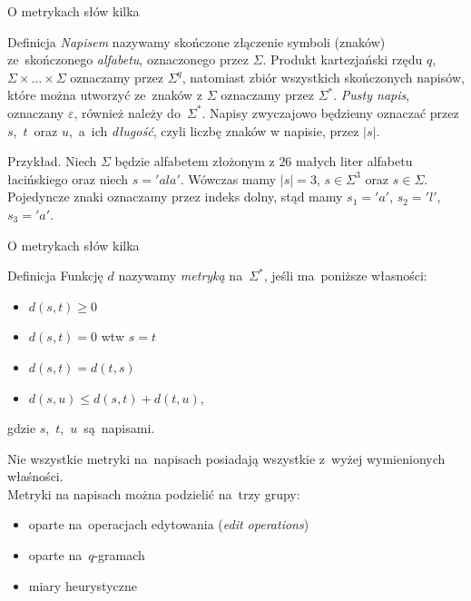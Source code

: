 \documentclass[11pt,pdftex,mathserif]{beamer}\usepackage[]{graphicx}\usepackage[]{color}
\theoremstyle{definition}
\begin{document}
\begin{frame}{O metrykach słów kilka}
\begin{block}{Definicja}
\emph{Napisem} nazywamy skończone złączenie symboli (znaków) ze~skończonego \emph{alfabetu}, oznaczonego przez $\Sigma$. Produkt kartezjański rzędu $q$, $\Sigma\times\ldots\times\Sigma$ oznaczamy przez $\Sigma^q$, natomiast zbiór wszystkich skończonych napisów, które można utworzyć ze~znaków z $\Sigma$ oznaczamy przez $\Sigma^*$. \emph{Pusty napis}, oznaczany $\varepsilon$, również należy do~$\Sigma^*$. Napisy zwyczajowo będziemy oznaczać przez $s$,~$t$~oraz $u$,~a~ich \emph{długość}, czyli liczbę znaków w napisie, przez $|s|$.
\end{block}
\pause
Przykład. Niech $\Sigma$ będzie alfabetem złożonym z $26$ małych liter alfabetu łacińskiego oraz niech $s = 'ala'$. Wówczas mamy $|s| = 3$, $s \in \Sigma^3$ oraz $s \in \Sigma$. Pojedyncze znaki oznaczamy przez indeks dolny, stąd mamy $s_1 = 'a'$, $s_2 = 'l'$, $s_3 = 'a'$. %
\cite{Loo2014:stringdist}
\end{frame}


\begin{frame}{O metrykach słów kilka}
\begin{block}{Definicja}
Funkcję $d$ nazywamy \emph{metryką} na~$\Sigma^*$, jeśli ma~poniższe własności:
\begin{itemize}
\item $d(s,t) \geq 0$
\item $d(s,t) = 0$ wtw $s = t$
\item $d(s,t) = d(t,s)$
\item $d(s,u) \leq d(s,t) + d(t,u)$,
\end{itemize}
gdzie $s$,~$t$,~$u$~są~napisami.
\end{block}
\pause
Nie wszystkie metryki na~napisach posiadają wszystkie z~wyżej wymienionych właśności.\\
\pause
Metryki na napisach można podzielić na~trzy grupy:
\begin{itemize}
\item oparte na~operacjach edytowania (\emph{edit operations})
\item oparte na~$q$-gramach
\item miary heurystyczne
\end{itemize}
\end{frame}
\end{document}
